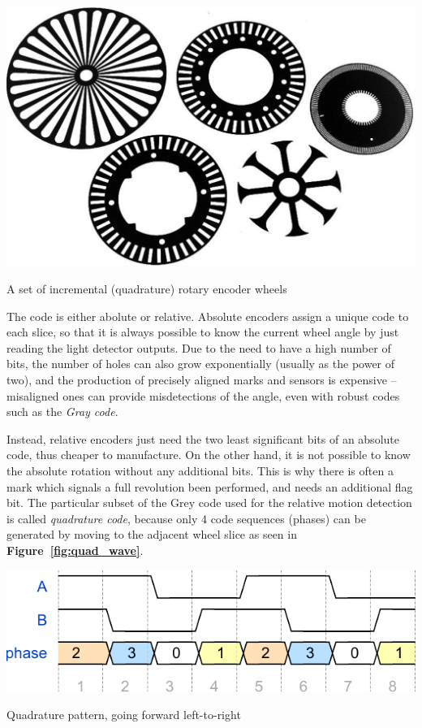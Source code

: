 \documentclass[a4paper,10pt]{article}
\makeatletter
\newenvironment{figurehere}{\def\@captype{figure}\vspace{2ex}}{\vspace{2ex}}
\newcommand{\citef}[1]{\textbf{Figure~\ref{#1}}}
\makeatother
\begin{document}
\begin{multicols}{2}
\begin{figurehere}
	\centering
	\includegraphics[keepaspectratio=true,width=0.9\columnwidth]{images/encoder_wheels.pdf}
	\caption{A set of incremental (quadrature) rotary encoder wheels}
	\label{fig:encoder_wheels}
\end{figurehere}

The code is either abolute or relative. Absolute encoders assign a unique code
to each slice, so that it is always possible to know the current wheel angle
by just reading the light detector outputs. Due to the need to have a high
number of bits, the number of holes can also grow exponentially (usually as
the power of two), and the production of precisely aligned marks and sensors
is expensive -- misaligned ones can provide misdetections of the angle, even
with robust codes such as the \emph{Gray code}.

Instead, relative encoders just need the two least significant bits of an
absolute code, thus cheaper to manufacture. On the other hand, it is not
possible to know the absolute rotation without any additional bits. This is
why there is often a mark which signals a full revolution been performed, and
needs an additional flag bit. The particular subset of the Grey code used for
the relative motion detection is called \emph{quadrature code}, because only 4
code sequences (phases) can be generated by moving to the adjacent wheel slice
as seen in \citef{fig:quad_wave}.

\begin{figurehere}
	\centering
	\includegraphics[keepaspectratio=true,width=0.9\columnwidth]{images/quad_wave.pdf}
	\caption{Quadrature pattern, going forward left-to-right}
	\label{fig:quad_wave}
\end{figurehere}


\end{multicols}
\end{document}
